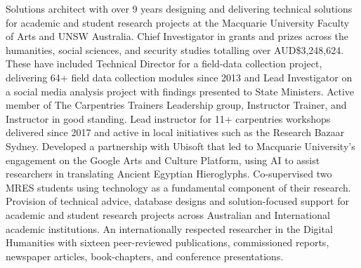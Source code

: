 
Solutions architect with over 9 years designing and delivering technical solutions for academic and student research projects at the Macquarie University Faculty of Arts and UNSW Australia. Chief Investigator in grants and prizes across the humanities, social sciences, and security studies totalling over AUD\$3,248,624. These have included Technical Director for a field-data collection project, delivering 64+ field data collection modules since 2013 and Lead Investigator on a social media analysis project with findings presented to State Ministers. Active member of The Carpentries Trainers Leadership group, Instructor Trainer, and Instructor in good standing. Lead instructor for 11+ carpentries workshops delivered since 2017 and active in local initiatives such as the Research Bazaar Sydney. Developed a partnership with Ubisoft that led to Macquarie University's engagement on the Google Arts and Culture Platform, using AI to assist researchers in translating Ancient Egyptian Hieroglyphs. Co-supervised two MRES students using technology as a fundamental component of their research. Provision of technical advice, database designs and solution-focused support for academic and student research projects across Australian and International academic institutions. An internationally respected researcher in the Digital Humanities with sixteen peer-reviewed publications, commissioned reports, newspaper articles, book-chapters, and conference presentations.


